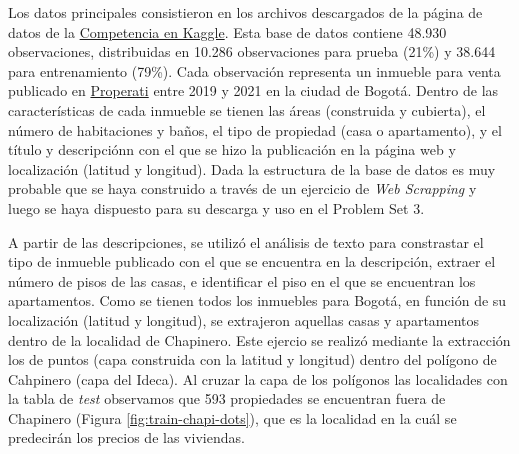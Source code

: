 \documentclass[
  11pt,
  letterpaper,
]{article}
\begin{document}
Los datos principales consistieron en los archivos descargados de la página de datos de la \href{https://www.kaggle.com/competitions/uniandes-bdml-202410-ps3}{Competencia en Kaggle}. Esta base de datos contiene 48.930 observaciones, distribuidas en 10.286 observaciones para prueba (21\%) y 38.644 para entrenamiento (79\%). Cada observación representa un inmueble para venta publicado en \href{ https://www.properati.com.co/}{Properati} entre 2019 y 2021 en la ciudad de Bogotá. Dentro de las características de cada inmueble se tienen las áreas (construida y cubierta), el número de habitaciones y baños, el tipo de propiedad (casa o apartamento), y el título y descripciónn con el que se hizo la publicación en la página web y localización (latitud y longitud). Dada la estructura de la base de datos es muy probable que se haya construido a través de un ejercicio de \textit{Web Scrapping} y luego se haya dispuesto para su descarga y uso en el Problem Set 3.

A partir de las descripciones, se utilizó el análisis de texto para constrastar el tipo de inmueble publicado con el que se encuentra en la descripción, extraer el número de pisos de las casas, e identificar el piso en el que se encuentran los apartamentos. Como se tienen todos los inmuebles para Bogotá, en función de su localización (latitud y longitud), se extrajeron aquellas casas y apartamentos dentro de la localidad de Chapinero. Este ejercio se realizó mediante la extracción los de puntos (capa construida con la latitud y longitud) dentro del polígono de Cahpinero (capa del Ideca). Al cruzar la capa de los polígonos las localidades con la tabla de \emph{test} observamos que 593 propiedades se encuentran fuera de Chapinero (Figura \ref{fig:train-chapi-dots}), que es la localidad en la cuál se predecirán los precios de las viviendas.
\end{document}
